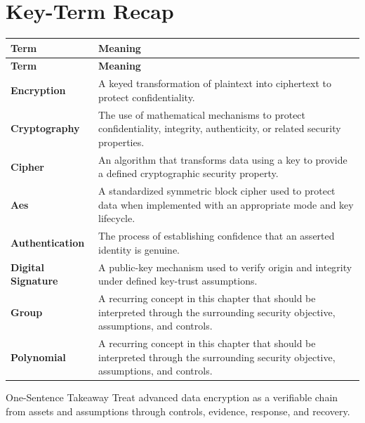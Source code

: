 \documentclass[11pt,letterpaper]{article}
\begin{document}
\section*{Key-Term Recap}
\begin{longtable}{>{\raggedright\arraybackslash}p{}>{\raggedright\arraybackslash}p{}}
\toprule\rowcolor{Navy}\color{white}\textbf{Term} & \color{white}\textbf{Meaning}\\\midrule
\endfirsthead
\toprule\rowcolor{Navy}\color{white}\textbf{Term} & \color{white}\textbf{Meaning}\\\midrule
\endhead
\textbf{Encryption} & A keyed transformation of plaintext into ciphertext to protect confidentiality. \\\midrule
\textbf{Cryptography} & The use of mathematical mechanisms to protect confidentiality, integrity, authenticity, or related security properties. \\\midrule
\textbf{Cipher} & An algorithm that transforms data using a key to provide a defined cryptographic security property. \\\midrule
\textbf{Aes} & A standardized symmetric block cipher used to protect data when implemented with an appropriate mode and key lifecycle. \\\midrule
\textbf{Authentication} & The process of establishing confidence that an asserted identity is genuine. \\\midrule
\textbf{Digital Signature} & A public-key mechanism used to verify origin and integrity under defined key-trust assumptions. \\\midrule
\textbf{Group} & A recurring concept in this chapter that should be interpreted through the surrounding security objective, assumptions, and controls. \\\midrule
\textbf{Polynomial} & A recurring concept in this chapter that should be interpreted through the surrounding security objective, assumptions, and controls. \\\midrule
\bottomrule
\end{longtable}
\begin{CornellExamBox}{One-Sentence Takeaway}
Treat advanced data encryption as a verifiable chain from assets and assumptions through controls, evidence, response, and recovery.
\end{CornellExamBox}
\end{document}
